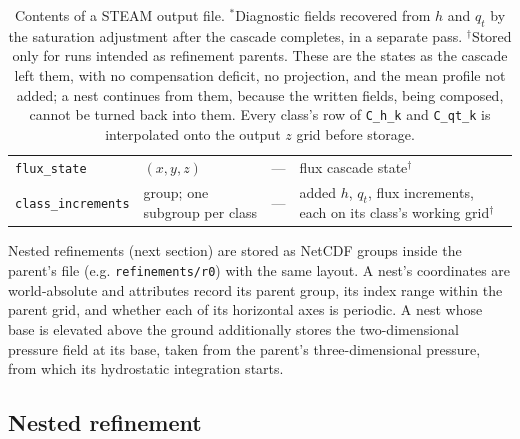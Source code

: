 \documentclass{article}
\begin{document}
\begin{table}
\begin{tabular}{llll}
\texttt{flux\_state} & $(x,y,z)$ & --- & flux cascade state$^{\dagger}$ \\
\texttt{class\_increments} & group; one subgroup per class & --- & added $h$, $q_t$, flux increments, each on its class's working grid$^{\dagger}$ \\
\hline
\end{tabular}
\caption{Contents of a STEAM output file. $^{\ast}$Diagnostic fields
recovered from $h$ and $q_t$ by the saturation adjustment after the
cascade completes, in a separate pass. $^{\dagger}$Stored only for
runs intended as refinement parents. These are the states as the
cascade left them, with no compensation deficit, no projection, and
the mean profile not added; a nest continues from them, because the
written fields, being composed, cannot be turned back into them.
Every class's row of \texttt{C\_h\_k} and \texttt{C\_qt\_k} is
interpolated onto the output $z$ grid before storage.}\label{tab:output file}
\end{table}

Nested refinements (next section) are stored as NetCDF groups inside
the parent's file (e.g. \texttt{refinements/r0}) with the same layout.
A nest's coordinates are world-absolute and attributes record its
parent group, its index range within the parent grid, and whether each
of its horizontal axes is periodic. A nest whose base is elevated
above the ground additionally stores the two-dimensional pressure
field at its base, taken from the parent's three-dimensional pressure,
from which its hydrostatic integration starts.

\subsection{Nested refinement}\label{sect:nested refinement}
\end{document}

